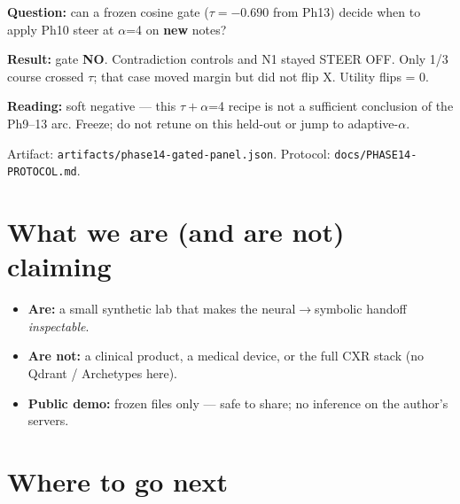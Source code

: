 \documentclass[11pt,a4paper]{article}
\begin{document}
\textbf{Question:} can a frozen cosine gate ($\tau{=}{-}0.690$ from Ph13) decide when to apply Ph10 steer at $\alpha$=4 on \textbf{new} notes?

\textbf{Result:} gate \textbf{NO}. Contradiction controls and N1 stayed STEER OFF. Only 1/3 course crossed $\tau$; that case moved margin but did not flip X. Utility flips = 0.

\textbf{Reading:} soft negative --- this $\tau{+}\alpha$=4 recipe is not a sufficient conclusion of the Ph9--13 arc. Freeze; do not retune on this held-out or jump to adaptive-$\alpha$.

Artifact: \texttt{artifacts/phase14-gated-panel.json}. Protocol: \texttt{docs/PHASE14-PROTOCOL.md}.

\section{What we are (and are not) claiming}

\begin{itemize}
  \item \textbf{Are:} a small synthetic lab that makes the neural$\rightarrow$symbolic handoff \emph{inspectable}.
  \item \textbf{Are not:} a clinical product, a medical device, or the full CXR stack (no Qdrant / Archetypes here).
  \item \textbf{Public demo:} frozen files only --- safe to share; no inference on the author's servers.
\end{itemize}

\section{Where to go next}
\end{document}
